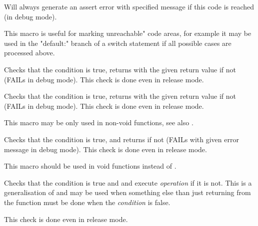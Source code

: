 \label{wxfailmsg}


Will always generate an assert error with specified message if this code is reached (in debug mode).

This macro is useful for marking unreachable" code areas, for example
it may be used in the "default:" branch of a switch statement if all possible
cases are processed above.




\label{wxcheck}


Checks that the condition is true, returns with the given return value if not (FAILs in debug mode).
This check is done even in release mode.


\label{wxcheckmsg}


Checks that the condition is true, returns with the given return value if not (FAILs in debug mode).
This check is done even in release mode.

This macro may be only used in non-void functions, see also
.


\label{wxcheckret}


Checks that the condition is true, and returns if not (FAILs with given error
message in debug mode). This check is done even in release mode.

This macro should be used in void functions instead of
.


\label{wxcheck2}


Checks that the condition is true and  and execute
{\it operation} if it is not. This is a generalisation of
 and may be used when something else than just
returning from the function must be done when the {\it condition} is false.

This check is done even in release mode.



